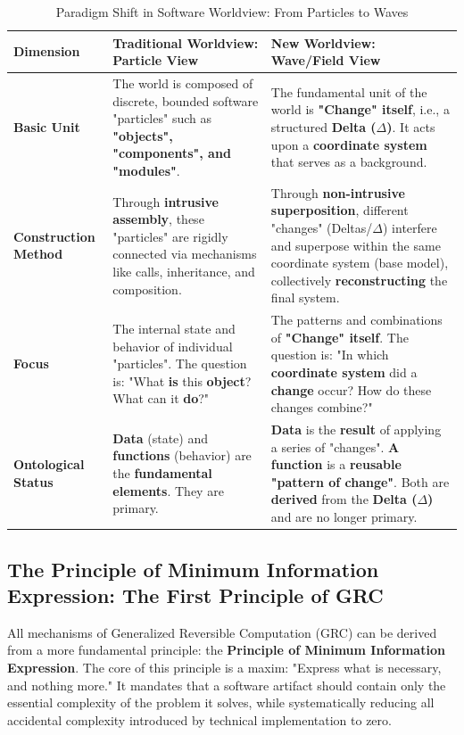 \documentclass[11pt]{article}
\begin{document}
\begin{table}[htbp]
\centering
\caption{Paradigm Shift in Software Worldview: From Particles to Waves}
\begin{tabularx}{\textwidth}{@{} l X X @{}}
\toprule
\textbf{Dimension} & \textbf{Traditional Worldview: Particle View} & \textbf{New Worldview: Wave/Field View} \\
\midrule
\textbf{Basic Unit} & The world is composed of discrete, bounded software "particles" such as \textbf{"objects", "components", and "modules"}. & The fundamental unit of the world is \textbf{"Change" itself}, i.e., a structured \textbf{Delta ($\Delta$)}. It acts upon a \textbf{coordinate system} that serves as a background. \\
\addlinespace
\textbf{Construction Method} & Through \textbf{intrusive assembly}, these "particles" are rigidly connected via mechanisms like calls, inheritance, and composition. & Through \textbf{non-intrusive superposition}, different "changes" (Deltas/$\Delta$) interfere and superpose within the same coordinate system (base model), collectively \textbf{reconstructing} the final system. \\
\addlinespace
\textbf{Focus} & The internal state and behavior of individual "particles". The question is: "What \textbf{is} this \textbf{object}? What can it \textbf{do}?" & The patterns and combinations of \textbf{"Change" itself}. The question is: "In which \textbf{coordinate system} did a \textbf{change} occur? How do these changes combine?" \\
\addlinespace
\textbf{Ontological Status} & \textbf{Data} (state) and \textbf{functions} (behavior) are the \textbf{fundamental elements}. They are primary. & \textbf{Data} is the \textbf{result} of applying a series of "changes". \textbf{A function} is a \textbf{reusable "pattern of change"}. Both are \textbf{derived} from the \textbf{Delta ($\Delta$)} and are no longer primary. \\
\bottomrule
\end{tabularx}
\label{tab:paradigm_shift}
\end{table}

\subsection{The Principle of Minimum Information Expression: The First Principle of GRC}

All mechanisms of Generalized Reversible Computation (GRC) can be derived from a more fundamental principle: the \textbf{Principle of Minimum Information Expression}. The core of this principle is a maxim: "Express what is necessary, and nothing more." It mandates that a software artifact should contain only the essential complexity of the problem it solves, while systematically reducing all accidental complexity introduced by technical implementation to zero.
\end{document}
